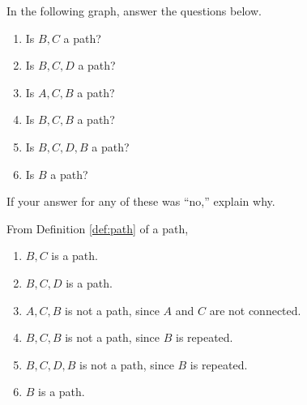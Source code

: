\documentclass[11pt]{article}
\begin{document}
\begin{problem} %
In the following graph, answer the questions below.
\begin{center}
\end{center}
\begin{enumerate}[label=(\alph*)]
\item Is $B,C$ a path?
\item Is $B,C,D$ a path?
\item Is $A,C,B$ a path?
\item Is $B,C,B$ a path?
\item Is $B,C,D,B$ a path?
\item Is $B$ a path?
\end{enumerate}
If your answer for any of these was ``no,'' explain why.
\end{problem}

\begin{solution}
From Definition \ref{def:path} of a path,
\begin{enumerate}[label=(\alph*)]
\item $B,C$ is a path.
\item $B,C,D$ is a path.
\item $A,C,B$ is not a path, since $A$ and $C$ are not connected.
\item $B,C,B$ is not a path, since $B$ is repeated.
\item $B,C,D,B$ is not a path, since $B$ is repeated.
\item $B$ is a path.
\end{enumerate}
\end{solution}




\end{document}
